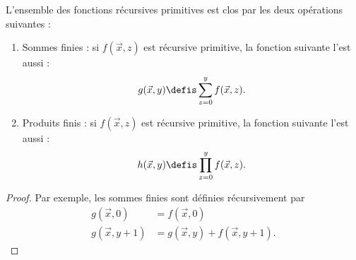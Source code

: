 \documentclass[../../../include/open-logic-section]{subfiles}
\begin{document}
\begin{prop}
L'ensemble des fonctions récursives primitives est
clos par les deux opérations suivantes :
\begin{enumerate}
\item Sommes finies : si $f(\vec x,z)$ est récursive primitive,
la fonction suivante l'est aussi :
\[
g(\vec x, y) \defis \sum_{z = 0}^y f(\vec x, z).
\]
\item Produits finis : si $f(\vec x,z)$ est récursive primitive,
la fonction suivante l'est aussi :
\[
h(\vec x, y) \defis \prod_{z = 0}^y f(\vec x, z).
\]
\end{enumerate}
\end{prop}

\begin{proof}
Par exemple, les sommes finies sont définies récursivement par
\begin{align*}
  g(\vec x, 0) & = f(\vec x, 0)\\
  g(\vec x, y+1) & = g(\vec x, y) + f(\vec x, y+1).
\end{align*}
\end{proof}
\end{document}
